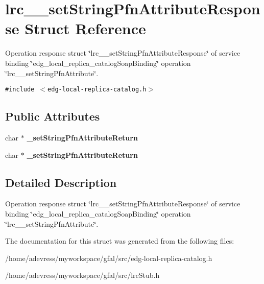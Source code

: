 \section{lrc\_\-\_\-set\-String\-Pfn\-Attribute\-Response Struct Reference}
\label{structlrc____setStringPfnAttributeResponse}
Operation response struct \char`\"{}lrc\_\-\_\-set\-String\-Pfn\-Attribute\-Response\char`\"{} of service binding \char`\"{}edg\_\-local\_\-replica\_\-catalog\-Soap\-Binding\char`\"{} operation \char`\"{}lrc\_\-\_\-set\-String\-Pfn\-Attribute\char`\"{}.  


{\tt \#include $<$edg-local-replica-catalog.h$>$}

\subsection*{Public Attributes}
\begin{CompactItemize}
\item 
char $\ast$ \textbf{\_\-set\-String\-Pfn\-Attribute\-Return}\label{structlrc____setStringPfnAttributeResponse_c1343cc97c43a9e6294f22e527a3d481}

\item 
char $\ast$ \textbf{\_\-set\-String\-Pfn\-Attribute\-Return}\label{structlrc____setStringPfnAttributeResponse_c1343cc97c43a9e6294f22e527a3d481}

\end{CompactItemize}


\subsection{Detailed Description}
Operation response struct \char`\"{}lrc\_\-\_\-set\-String\-Pfn\-Attribute\-Response\char`\"{} of service binding \char`\"{}edg\_\-local\_\-replica\_\-catalog\-Soap\-Binding\char`\"{} operation \char`\"{}lrc\_\-\_\-set\-String\-Pfn\-Attribute\char`\"{}. 



The documentation for this struct was generated from the following files:\begin{CompactItemize}
\item 
/home/adevress/myworkspace/gfal/src/edg-local-replica-catalog.h\item 
/home/adevress/myworkspace/gfal/src/lrc\-Stub.h\end{CompactItemize}
